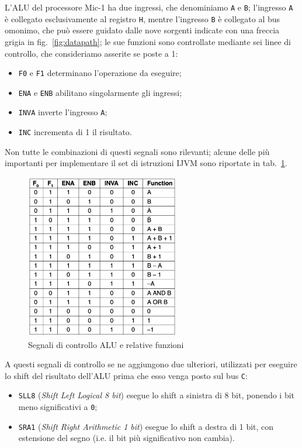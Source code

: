 \documentclass[a4paper,12pt]{scrreprt}
\begin{document}
L'ALU del processore Mic-1 ha due ingressi, che denominiamo \lstinline{A} e
\lstinline{B}; l'ingresso \lstinline{A} è collegato esclusivamente al registro
\lstinline{H}, mentre l'ingresso \lstinline{B} è collegato al bus
omonimo, che può essere guidato dalle nove sorgenti indicate con una freccia
grigia in fig.~\ref{fig:datapath}; le sue funzioni sono controllate mediante sei
linee di controllo, che consideriamo asserite se poste a 1:
\begin{itemize}
  \item \lstinline{F0} e \lstinline{F1} determinano l'operazione da eseguire;
  \item \lstinline{ENA} e \lstinline{ENB} abilitano singolarmente gli ingressi;
  \item \lstinline{INVA} inverte l'ingresso \lstinline{A};
  \item \lstinline{INC} incrementa di 1 il risultato.
\end{itemize}

Non tutte le combinazioni di questi segnali sono rilevanti; alcune delle più
importanti per implementare il set di istruzioni IJVM sono riportate in
tab.~\ref{fig:alu_func}.

\begin{figure}
  \centering
  \includegraphics[width=0.6\textwidth]{alu_func.png}
  \caption{Segnali di controllo ALU e relative funzioni}\label{fig:alu_func}
\end{figure}

A questi segnali di controllo se ne aggiungono due ulteriori, utilizzati per
eseguire lo shift del risultato dell'ALU prima che esso venga posto sul bus
\lstinline{C}:
\begin{itemize}
  \item \lstinline{SLL8} (\textit{Shift Left Logical 8 bit}) esegue lo shift a
  sinistra di 8 bit, ponendo i bit meno significativi a \lstinline{0};
  \item \lstinline{SRA1} (\textit{Shift Right Arithmetic 1 bit}) esegue lo shift
  a destra di 1 bit, con estensione del segno (i.e. il bit più significativo non
  cambia).
\end{itemize}
\end{document}
